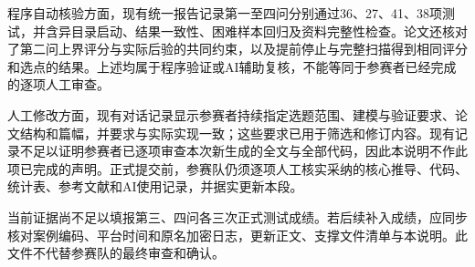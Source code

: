 \documentclass[a4paper,UTF8,zihao=-4,fontset=none]{ctexart}
\begin{document}
程序自动核验方面，现有统一报告记录第一至四问分别通过36、27、41、38项测试，并含异目录启动、结果一致性、困难样本回归及资料完整性检查。论文还核对了第二问上界评分与实际后验的共同约束，以及提前停止与完整扫描得到相同评分和选点的结果。上述均属于程序验证或AI辅助复核，不能等同于参赛者已经完成的逐项人工审查。

人工修改方面，现有对话记录显示参赛者持续指定选题范围、建模与验证要求、论文结构和篇幅，并要求与实际实现一致；这些要求已用于筛选和修订内容。现有记录不足以证明参赛者已逐项审查本次新生成的全文与全部代码，因此本说明不作此项已完成的声明。正式提交前，参赛队仍须逐项人工核实采纳的核心推导、代码、统计表、参考文献和AI使用记录，并据实更新本段。

当前证据尚不足以填报第三、四问各三次正式测试成绩。若后续补入成绩，应同步核对案例编码、平台时间和原名加密日志，更新正文、支撑文件清单与本说明。此文件不代替参赛队的最终审查和确认。
\end{document}
